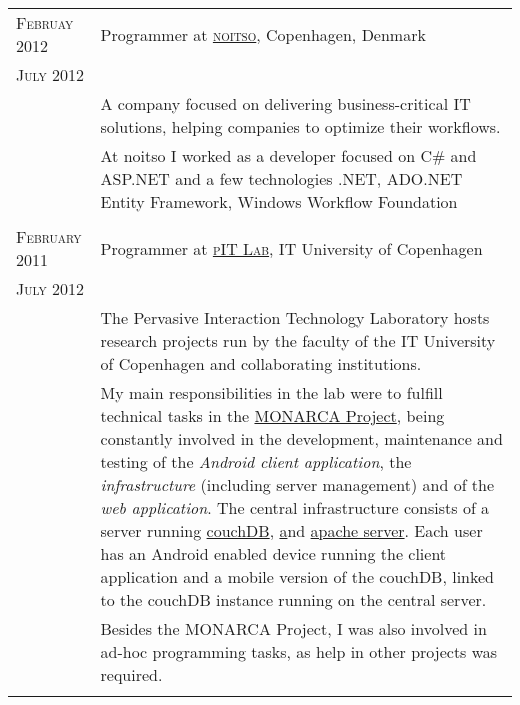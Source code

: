 \documentclass[a4paper,10pt]{article}
\begin{document}
\begin{longtable}{p{2.5cm}|p{11cm}}
 \raggedleft \textsc{Februay 2012} & Programmer at
 \textsc{\href{http://www.noitso.dk/}{noitso}}, Copenhagen, Denmark
 \\\raggedleft \textsc{July 2012}\\& 
 \footnotesize{A company focused on delivering business-critical IT solutions, helping companies to optimize their workflows.}\\

& \footnotesize{At noitso I worked as a developer focused on C\# and ASP.NET and a few technologies .NET, ADO.NET Entity
Framework, Windows Workflow Foundation}\\
\multicolumn{2}{c}{} \\ 

 \raggedleft \textsc{February 2011} & Programmer at
 \textsc{\href{http://www.itu.dk/pit/}{pIT Lab}}, IT University of Copenhagen
 \\\raggedleft \textsc{July 2012}\\& 
 \footnotesize{The Pervasive Interaction Technology Laboratory hosts research
 projects run by the faculty of the IT University of Copenhagen and
 collaborating institutions.}\\

 & \footnotesize{My main responsibilities in the lab were to fulfill technical
 tasks in the \href{http://www.monarca-project.eu/}{MONARCA Project}, being constantly involved in the  development, maintenance and testing of the \emph{Android client application}, the \emph{infrastructure} (including server management) and of the \emph{web application}. The central infrastructure consists of a server running \href{http://couchdb.apache.org}{couchDB}, \href{http://www.joomla.org} and \href{http://httpd.apache.org}{apache server}. Each user has an Android enabled device running the client application and a mobile version of the couchDB, linked to the couchDB instance running on the central server.}\\

& \footnotesize{Besides the MONARCA Project, I was also involved in ad-hoc programming tasks, as help in other projects was required.}\\
\multicolumn{2}{c}{} \\ 


\end{longtable}
\end{document}
